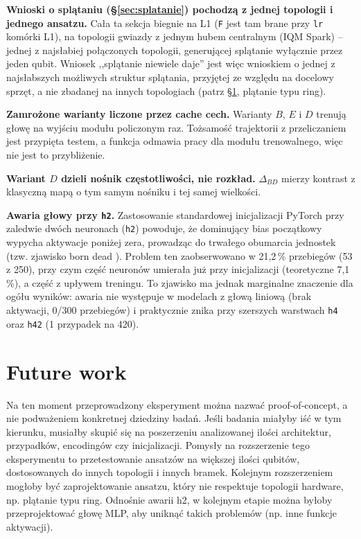 \documentclass[11pt, a4paper]{article}
\begin{document}
\textbf{Wnioski o splątaniu (\S\ref{sec:splatanie}) pochodzą z jednej topologii i jednego ansatzu.} Cała ta sekcja biegnie na L1 (\texttt{F} jest tam brane przy \texttt{lr} komórki L1), na topologii gwiazdy z jednym hubem centralnym (IQM Spark) -- jednej z najsłabiej połączonych topologii, generującej splątanie wyłącznie przez jeden qubit. Wniosek ,,splątanie niewiele daje'' jest więc wnioskiem o jednej z najsłabszych możliwych struktur splątania, przyjętej ze względu na docelowy sprzęt, a nie zbadanej na innych topologiach (patrz \S\ref{sec:future}, plątanie typu ring).

\textbf{Zamrożone warianty liczone przez cache cech.} Warianty $B$, $E$ i $D$ trenują głowę na wyjściu modułu policzonym raz. Tożsamość trajektorii z przeliczaniem jest przypięta testem, a funkcja odmawia pracy dla modułu trenowalnego, więc nie jest to przybliżenie.

\textbf{Wariant $D$ dzieli nośnik częstotliwości, nie rozkład.} $\Delta_{BD}$ mierzy kontrast z klasyczną mapą o tym samym nośniku i tej samej wielkości.

\textbf{Awaria głowy przy \texttt{h2}.} Zastosowanie standardowej inicjalizacji PyTorch przy zaledwie dwóch neuronach (\texttt{h2}) powoduje, że dominujący bias początkowy wypycha aktywacje poniżej zera, prowadząc do trwałego obumarcia jednostek (tzw. zjawisko born dead \citep{lu2020}). Problem ten zaobserwowano w 21,2\,\% przebiegów (53 z 250), przy czym część neuronów umierała już przy inicjalizacji (teoretyczne 7,1\,\%), a część z upływem treningu. 
To zjawisko ma jednak marginalne znaczenie dla ogółu wyników: awaria nie występuje w modelach z głową liniową (brak aktywacji, 0/300 przebiegów) i praktycznie znika przy szerszych warstwach \texttt{h4} oraz \texttt{h42} (1 przypadek na 420).

\section{Future work}\label{sec:future}
Na ten moment przeprowadzony eksperyment można nazwać proof-of-concept, a nie podważeniem konkretnej dziedziny badań. Jeśli badania miałyby iść w tym kierunku, musiałby skupić się na poszerzeniu analizowanej ilości architektur, przypadków, encodingów czy inicjalizacji. Pomysły na rozszerzenie tego eksperymentu to przetestowanie ansatzów na większej ilości qubitów, dostosowanych do innych topologii i innych bramek. Kolejnym rozszerzeniem mogłoby być zaprojektowanie ansatzu, który nie respektuje topologii hardware, np. plątanie typu ring. Odnośnie awarii h2, w kolejnym etapie można byłoby przeprojektować głowę MLP, aby uniknąć takich problemów (np. inne funkcje aktywacji).
\end{document}
